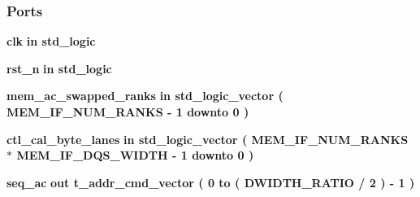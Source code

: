 \subsubsection*{Ports}
 \begin{DoxyCompactItemize}
\item 
{\bf clk}  {\bfseries {\bfseries \textcolor{keywordflow}{in}\textcolor{vhdlchar}{ }}} {\bfseries \textcolor{comment}{std\+\_\+logic}\textcolor{vhdlchar}{ }} 
\item 
{\bf rst\+\_\+n}  {\bfseries {\bfseries \textcolor{keywordflow}{in}\textcolor{vhdlchar}{ }}} {\bfseries \textcolor{comment}{std\+\_\+logic}\textcolor{vhdlchar}{ }} 
\item 
{\bf mem\+\_\+ac\+\_\+swapped\+\_\+ranks}  {\bfseries {\bfseries \textcolor{keywordflow}{in}\textcolor{vhdlchar}{ }}} {\bfseries \textcolor{comment}{std\+\_\+logic\+\_\+vector}\textcolor{vhdlchar}{ }\textcolor{vhdlchar}{(}\textcolor{vhdlchar}{ }\textcolor{vhdlchar}{ }\textcolor{vhdlchar}{ }\textcolor{vhdlchar}{ }{\bfseries {\bf M\+E\+M\+\_\+\+I\+F\+\_\+\+N\+U\+M\+\_\+\+R\+A\+N\+KS}} \textcolor{vhdlchar}{-\/}\textcolor{vhdlchar}{ } \textcolor{vhdldigit}{1} \textcolor{vhdlchar}{ }\textcolor{keywordflow}{downto}\textcolor{vhdlchar}{ }\textcolor{vhdlchar}{ } \textcolor{vhdldigit}{0} \textcolor{vhdlchar}{ }\textcolor{vhdlchar}{)}\textcolor{vhdlchar}{ }} 
\item 
{\bf ctl\+\_\+cal\+\_\+byte\+\_\+lanes}  {\bfseries {\bfseries \textcolor{keywordflow}{in}\textcolor{vhdlchar}{ }}} {\bfseries \textcolor{comment}{std\+\_\+logic\+\_\+vector}\textcolor{vhdlchar}{ }\textcolor{vhdlchar}{(}\textcolor{vhdlchar}{ }\textcolor{vhdlchar}{ }\textcolor{vhdlchar}{ }\textcolor{vhdlchar}{ }{\bfseries {\bf M\+E\+M\+\_\+\+I\+F\+\_\+\+N\+U\+M\+\_\+\+R\+A\+N\+KS}} \textcolor{vhdlchar}{$\ast$}\textcolor{vhdlchar}{ }\textcolor{vhdlchar}{ }\textcolor{vhdlchar}{ }{\bfseries {\bf M\+E\+M\+\_\+\+I\+F\+\_\+\+D\+Q\+S\+\_\+\+W\+I\+D\+TH}} \textcolor{vhdlchar}{-\/}\textcolor{vhdlchar}{ } \textcolor{vhdldigit}{1} \textcolor{vhdlchar}{ }\textcolor{keywordflow}{downto}\textcolor{vhdlchar}{ }\textcolor{vhdlchar}{ } \textcolor{vhdldigit}{0} \textcolor{vhdlchar}{ }\textcolor{vhdlchar}{)}\textcolor{vhdlchar}{ }} 
\item 
{\bf seq\+\_\+ac}  {\bfseries {\bfseries \textcolor{keywordflow}{out}\textcolor{vhdlchar}{ }}} {\bfseries {\bfseries {\bf t\+\_\+addr\+\_\+cmd\+\_\+vector}} \textcolor{vhdlchar}{ }\textcolor{vhdlchar}{(}\textcolor{vhdlchar}{ }\textcolor{vhdlchar}{ } \textcolor{vhdldigit}{0} \textcolor{vhdlchar}{ }\textcolor{keywordflow}{to}\textcolor{vhdlchar}{ }\textcolor{vhdlchar}{(}\textcolor{vhdlchar}{ }\textcolor{vhdlchar}{ }\textcolor{vhdlchar}{ }\textcolor{vhdlchar}{ }{\bfseries {\bf D\+W\+I\+D\+T\+H\+\_\+\+R\+A\+T\+IO}} \textcolor{vhdlchar}{/}\textcolor{vhdlchar}{ } \textcolor{vhdldigit}{2} \textcolor{vhdlchar}{ }\textcolor{vhdlchar}{)}\textcolor{vhdlchar}{ }\textcolor{vhdlchar}{-\/}\textcolor{vhdlchar}{ } \textcolor{vhdldigit}{1} \textcolor{vhdlchar}{ }\textcolor{vhdlchar}{)}\textcolor{vhdlchar}{ }} 

\end{DoxyCompactItemize}
